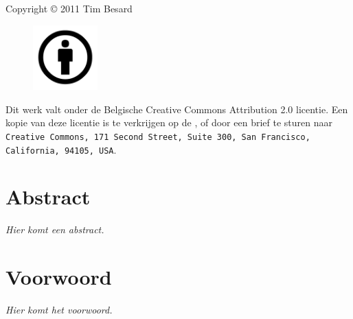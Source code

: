 %
%

\maketitle


%
%

\null
\vfill

Copyright © 2011 Tim Besard

\vspace{1cm}

\begin{figure}
\vspace{-16pt}
\centering
\includegraphics[width=2.5cm]{afbeeldingen/creative-commons-by}
\end{figure}

\noindent Dit werk valt onder de Belgische Creative Commons Attribution 2.0 licentie. Een kopie van deze licentie is te verkrijgen op de , of door een brief te sturen naar \texttt{Creative Commons, 171 Second Street, Suite 300, San Francisco, California, 94105, USA}.

\newpage


%
%

\chapter*{Abstract}

\textit{Hier komt een abstract.}


%
%

\chapter*{Voorwoord}

\textit{Hier komt het voorwoord.}


%
%

\setlength\cftpartnumwidth{2em}

\newpage
\tableofcontents

\newpage


